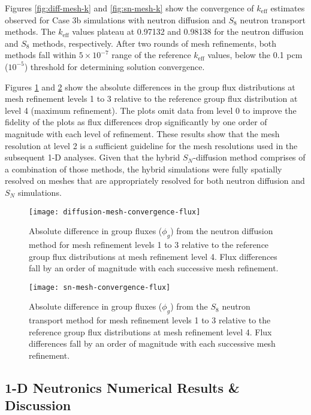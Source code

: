 Figures \ref{fig:diff-mesh-k} and \ref{fig:sn-mesh-k} show the convergence of $k_\text{eff}$
estimates observed for Case 3b simulations with neutron diffusion and $S_8$ neutron transport
methods. The $k_\text{eff}$ values plateau at 0.97132 and 0.98138 for the neutron diffusion and
$S_8$ methods, respectively. After two rounds of mesh refinements, both methods fall within
$5\times 10^{-7}$ range of the reference $k_\text{eff}$ values, below the 0.1 pcm ($10^{-5}$)
threshold for determining solution convergence.

Figures \ref{fig:diff-mesh-flux} and \ref{fig:sn-mesh-flux} show the absolute differences in the
group flux distributions at mesh refinement levels 1 to 3 relative to the reference group flux
distribution at level 4 (maximum refinement). The plots omit data from level 0 to improve the fidelity
of the plots as flux differences drop significantly by one order of magnitude with each level of
refinement.
These results show that the mesh resolution at level 2 is a sufficient guideline for
the mesh resolutions used in the subsequent 1-D analyses. Given that the hybrid $S_N$-diffusion
method comprises of a combination of those
methods, the hybrid simulations were fully spatially resolved on meshes that are
appropriately resolved for both neutron diffusion and $S_N$ simulations.

\begin{figure}[htb!]
  \centering
  \texttt{[image: diffusion-mesh-convergence-flux]}
  \caption{Absolute difference in group fluxes ($\phi_g$) from the neutron diffusion method for
  mesh refinement levels 1 to 3 relative to the reference group flux distributions at mesh
  refinement level 4. Flux differences fall by an order of magnitude with each successive mesh
  refinement.}
  \label{fig:diff-mesh-flux}
\end{figure}

\begin{figure}[htb!]
  \centering
  \texttt{[image: sn-mesh-convergence-flux]}
  \caption{Absolute difference in group fluxes ($\phi_g$) from the $S_8$ neutron transport method
  for mesh refinement levels 1 to 3 relative to the reference group flux distributions at mesh
  refinement level 4. Flux differences fall by an order of magnitude with each successive mesh
  refinement.}
  \label{fig:sn-mesh-flux}
\end{figure}

\FloatBarrier

\subsection{1-D Neutronics Numerical Results \& Discussion} \label{sec:1d-results-sub}

